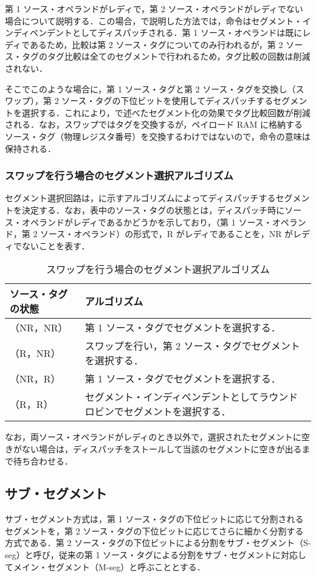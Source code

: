 第 1 ソース・オペランドがレディで，第 2 ソース・オペランドがレディでない場合について説明する．この場合，で説明した方法では，命令はセグメント・インディペンデントとしてディスパッチされる．第 1 ソース・オペランドは既にレディであるため，比較は第 2 ソース・タグについてのみ行われるが，第 2  ソース・タグのタグ比較は全てのセグメントで行われるため，タグ比較の回数は削減されない．

そこでこのような場合に，第 1 ソース・タグと第 2 ソース・タグを交換し（スワップ），第 2 ソース・タグの下位ビットを使用してディスパッチするセグメントを選択する．これにより，で述べたセグメント化の効果でタグ比較回数が削減される．なお，スワップではタグを交換するが，ペイロード RAM に格納するソース・タグ（物理レジスタ番号）を交換するわけではないので，命令の意味は保持される．

\subsubsection{スワップを行う場合のセグメント選択アルゴリズム}
セグメント選択回路は，に示すアルゴリズムによってディスパッチするセグメントを決定する．なお，表中のソース・タグの状態とは，ディスパッチ時にソース・オペランドがレディであるかどうかを示しており，（第 1 ソース・オペランド，第 2 ソース・オペランド）の形式で，R がレディであることを，NR がレディでないことを表す．

\begin{table}[htb]
  \caption{スワップを行う場合のセグメント選択アルゴリズム}
  \footnotesize
  \center
   \begin{tabular}{|l|l|} \hline \hline
    ソース・タグの状態 & アルゴリズム \\ \hline
    （NR，NR） & 第 1 ソース・タグでセグメントを選択する． \\ \hline
    （R，NR） & スワップを行い，第 2 ソース・タグでセグメントを選択する．\\ \hline
    （NR，R） & 第 1 ソース・タグでセグメントを選択する．\\ \hline
    （R，R） & セグメント・インディペンデントとしてラウンドロビンでセグメントを選択する． \\ \hline
  \end{tabular}
  \label{tab:agg_algorithm}
\end{table}
なお，両ソース・オペランドがレディのとき以外で，選択されたセグメントに空きがない場合は，ディスパッチをストールして当該のセグメントに空きが出るまで待ち合わせる．

\subsection{サブ・セグメント}
\label{sec:sub_segment}
サブ・セグメント方式は，第 1 ソース・タグの下位ビットに応じて分割されるセグメントを，第 2 ソース・タグの下位ビットに応じてさらに細かく分割する方式である．第 2 ソース・タグの下位ビットによる分割をサブ・セグメント（S-seg）と呼び，従来の第 1 ソース・タグによる分割をサブ・セグメントに対応してメイン・セグメント（M-seg）と呼ぶこととする．

